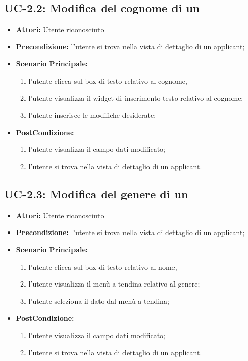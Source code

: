 \subsection{UC-2.2: Modifica del cognome di un \applicant}
\begin{itemize}
	\item \textbf{Attori:} Utente riconosciuto
	\item \textbf{Precondizione:}  l'utente si trova nella vista di dettaglio di un applicant;
	\item \textbf{Scenario Principale:}
	\begin{enumerate}
		\item l'utente clicca sul box di testo relativo al cognome,
		\item l'utente visualizza il  widget di inserimento testo relativo al cognome;
		\item l'utente inserisce le modifiche desiderate;
	\end{enumerate}
	\item \textbf{PostCondizione:} 
	\begin{enumerate}
		\item l'utente visualizza il campo dati modificato;
		\item l'utente si trova nella vista di dettaglio di un applicant.
	\end{enumerate}
	
\end{itemize}

\subsection{UC-2.3: Modifica del genere di un \applicant}
\begin{itemize}
	\item \textbf{Attori:} Utente riconosciuto
	\item \textbf{Precondizione:}  l'utente si trova nella vista di dettaglio di un applicant;
	\item \textbf{Scenario Principale:}
	\begin{enumerate}
		\item l'utente clicca sul box di testo relativo al nome,
		\item l'utente visualizza il  menù a tendina relativo al genere;
		\item l'utente seleziona il dato dal menù a tendina;
	\end{enumerate}
	\item \textbf{PostCondizione:} 
	\begin{enumerate}
		\item l'utente visualizza il campo dati modificato;
		\item l'utente si trova nella vista di dettaglio di un applicant.
	\end{enumerate}
	
\end{itemize}

